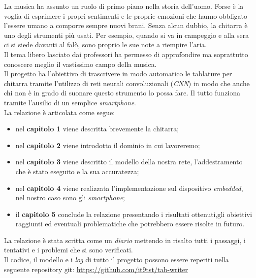 La musica ha assunto un ruolo di primo piano nella storia dell'uomo. Forse è la voglia di esprimere i propri sentimenti e le proprie emozioni che hanno obbligato l'essere umano a comporre sempre nuovi brani. Senza alcun dubbio, la chitarra è uno degli strumenti più usati. Per esempio, quando si va in campeggio e alla sera ci si siede davanti al falò, sono proprio le sue note a riempire l'aria.\\ Il tema libero lasciato dai professori ha permesso di approfondire ma soprattutto conoscere meglio il vastissimo campo della musica.  \\ Il progetto ha l'obiettivo di trascrivere in modo automatico le tablature per chitarra tramite l'utilizzo di reti neurali convoluzionali (\textit{CNN}) in modo che anche chi non è in grado di suonare questo strumento lo possa fare. Il tutto funziona tramite l'ausilio di un semplice \textit{smartphone}. \\

La relazione è articolata come segue:
\begin{itemize}
	\item nel \textbf{capitolo 1} viene descritta brevemente la chitarra;
	\item nel \textbf{capitolo 2} viene introdotto il dominio in cui lavoreremo;
	\item nel \textbf{capitolo 3} viene descritto il modello della nostra rete, l'addestramento che è stato eseguito e la sua accuratezza;
	\item nel \textbf{capitolo 4} viene realizzata l'implementazione sul dispositivo \textit{embedded}, nel nostro caso sono gli \textit{smartphone};
	\item il \textbf{capitolo 5} conclude la relazione presentando i risultati ottenuti,gli obiettivi raggiunti ed eventuali problematiche che potrebbero essere risolte in futuro.
\end{itemize}
La relazione è stata scritta come un \textit{diario} mettendo in risalto tutti i passaggi, i tentativi e i problemi che si sono verificati.\\
\newline
Il codice, il modello e i \textit{log} di tutto il progetto possono essere reperiti nella seguente repository git: \href{https://github.com/it9tst/tab-writer}{https://github.com/it9tst/tab-writer} 
 